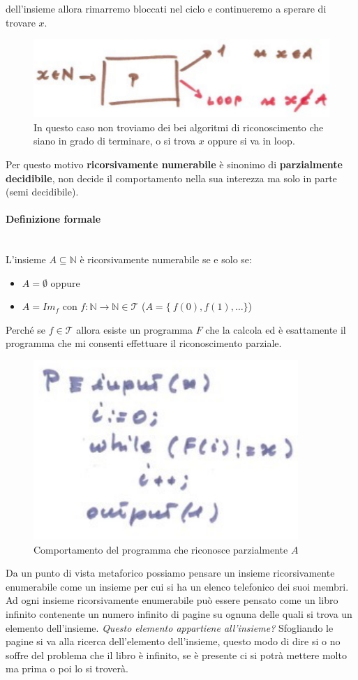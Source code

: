 \documentclass{article}
\begin{document}
dell'insieme allora rimarremo bloccati nel ciclo e continueremo a sperare di trovare $x$.
\begin{figure}[H]
    \centering
    \includegraphics[scale=0.6]{images/x_loop.png}
    \caption{In questo caso non troviamo dei bei algoritmi di riconoscimento che siano in grado di terminare,
        o si trova $x$ oppure si va in loop.}
\end{figure}
Per questo motivo \textbf{ricorsivamente numerabile} è sinonimo di \textbf{parzialmente
    decidibile}, non decide il comportamento nella sua interezza ma solo in parte (semi decidibile).

\paragraph{Definizione formale}\mbox{}\\
L'insieme $A\subseteq\mathbb{N}$ è ricorsivamente numerabile se e solo se:
\begin{itemize}
    \item $A=\emptyset$ oppure
    \item $A=Im_f$ con $f:\mathbb{N}\rightarrow\mathbb{N}\in\mathcal{T}$ ($A=\{\ f(0),f(1),\dots \}$)
\end{itemize}
Perché se $f\in\mathcal{T}$ allora esiste un programma $F$ che la calcola ed è esattamente
il programma che mi consenti effettuare il riconoscimento parziale.
\begin{figure}[H]
    \centering
    \includegraphics[scale=0.5]{images/prog_ricors_rico.png}
    \caption{Comportamento del programma che riconosce parzialmente $A$}
\end{figure}
Da un punto di vista metaforico possiamo pensare un insieme ricorsivamente enumerabile come
un insieme per cui si ha un elenco telefonico dei suoi membri. Ad ogni insieme ricorsivamente
enumerabile può essere pensato come un libro infinito contenente un numero infinito di pagine
su ognuna delle quali si trova un elemento dell'insieme. \textit{Questo elemento appartiene
    all'insieme?} Sfogliando le pagine si va alla ricerca dell'elemento dell'insieme, questo
modo di dire si o no soffre del problema che il libro è infinito, se è presente ci si
potrà mettere molto ma prima o poi lo si troverà.
\end{document}
